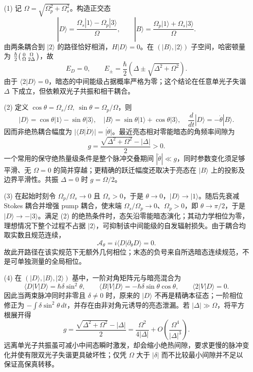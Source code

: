 (1) 记 \(\Omega=\sqrt{\Omega_p^2+\Omega_s^2}\)。构造正交态
\[
|D\rangle=\frac{\Omega_s|1\rangle-\Omega_p|3\rangle}{\Omega},\qquad
|B\rangle=\frac{\Omega_p|1\rangle+\Omega_s|3\rangle}{\Omega}.
\]
由两条耦合到 \(|2\rangle\) 的路径恰好相消，\(H|D\rangle=0\)。在 \((|B\rangle,|2\rangle)\) 子空间，哈密顿量为 \(\frac{\hbar}{2}\begin{psmallmatrix}0&\Omega\\\Omega&2\Delta\end{psmallmatrix}\)，故
\[
\boxed{E_D=0,\qquad E_\pm=\frac{\hbar}{2}\left(\Delta\pm\sqrt{\Delta^2+\Omega^2}\right)}.
\]
由于 \(\langle2|D\rangle=0\)，暗态的中间能级占据概率严格为零；这个结论在任意单光子失谐 \(\Delta\) 下成立，但依赖双光子共振和相干耦合。

(2) 定义 \(\cos\theta=\Omega_s/\Omega,\ \sin\theta=\Omega_p/\Omega\)，则
\[
|D\rangle=\cos\theta|1\rangle-\sin\theta|3\rangle,\quad
|B\rangle=\sin\theta|1\rangle+\cos\theta|3\rangle,\quad
\frac{d}{dt}|D\rangle=-\dot\theta|B\rangle.
\]
因而非绝热耦合幅度为 \(|\langle B|\dot D\rangle|=|\dot\theta|\)。最近亮态相对零能暗态的角频率间隙为
\[
\boxed{g=\frac{\sqrt{\Delta^2+\Omega^2}-|\Delta|}{2}>0}.
\]
一个常用的保守绝热量级条件是整个脉冲交叠期间 \(|\dot\theta|\ll g\)，同时参数变化须足够平滑、无 \(\Omega=0\) 的简并穿越；更精确的跃迁幅度还取决于亮态在 \(|B\rangle\) 上的投影及边界平滑性。共振 \(\Delta=0\) 时 \(g=\Omega/2\)。

(3) 在起始时刻令 \(\Omega_p/\Omega_s\to0\) 且 \(\Omega_s>0\)，于是 \(\theta\to0\)，\(|D\rangle\to|1\rangle\)。随后先衰减 Stokes 耦合并增强 pump 耦合，使末端 \(\Omega_s/\Omega_p\to0\)、\(\Omega_p>0\)，即 \(\theta\to\pi/2\)，于是 \(|D\rangle\to-|3\rangle\)。满足 (2) 的绝热条件时，态矢沿零能暗态演化；其动力学相位为零，理想情况下整个过程不占据 \(|2\rangle\)，可抑制该中间能级的自发辐射损失。由于耦合均取实数且规范连续，
\[
\mathcal A_\theta=i\langle D|\partial_\theta D\rangle=0.
\]
故此开路径在该实规范下无额外几何相位；末态的负号来自所选暗态连续规范，不是可单独测量的全局相位。

(4) 在 \((|D\rangle,|B\rangle,|2\rangle)\) 基中，一阶对角矩阵元与暗亮混合为
\[
\boxed{\langle D|V|D\rangle=\hbar\delta\sin^2\theta},\qquad
\boxed{\langle B|V|D\rangle=-\hbar\delta\sin\theta\cos\theta},\qquad
\langle2|V|D\rangle=0.
\]
因此当两束脉冲同时非零且 \(\delta\ne0\) 时，原来的 \(|D\rangle\) 不再是精确本征态；一阶相位修正为 \(-\int\delta\sin^2\theta\,dt\)，并存在由非对角元诱导的亮态泄漏。若 \(|\Delta|\gg\Omega\)，将平方根展开得
\[
\boxed{g=\frac{\sqrt{\Delta^2+\Omega^2}-|\Delta|}{2}
=\frac{\Omega^2}{4|\Delta|}+O\!\left(\frac{\Omega^4}{|\Delta|^3}\right)}.
\]
远离单光子共振虽可减小中间态瞬时激发，却会缩小绝热间隙，要求更慢的脉冲变化并使有限双光子失谐更具破坏性；仅凭 \(\Omega\) 大于 \(|\delta|\) 而不比较最小间隙并不足以保证高保真转移。
